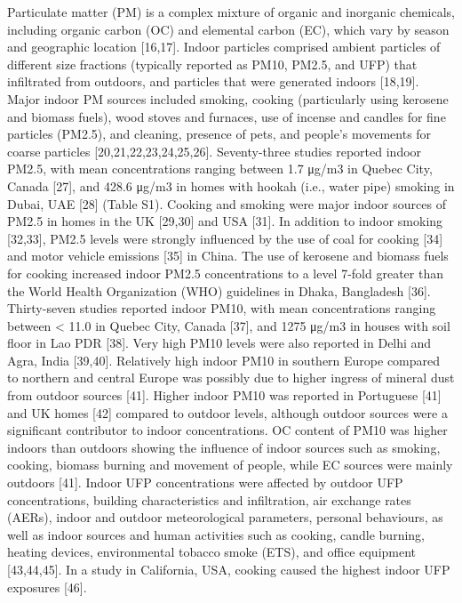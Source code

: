 Particulate matter (PM) is a complex mixture of organic and inorganic chemicals, including organic carbon (OC) and elemental carbon (EC), which vary by season and geographic location [16,17]. Indoor particles comprised ambient particles of different size fractions (typically reported as PM10, PM2.5, and UFP) that infiltrated from outdoors, and particles that were generated indoors [18,19]. Major indoor PM sources included smoking, cooking (particularly using kerosene and biomass fuels), wood stoves and furnaces, use of incense and candles for fine particles (PM2.5), and cleaning, presence of pets, and people’s movements for coarse particles [20,21,22,23,24,25,26].
Seventy-three studies reported indoor PM2.5, with mean concentrations ranging between 1.7 μg/m3 in Quebec City, Canada [27], and 428.6 μg/m3 in homes with hookah (i.e., water pipe) smoking in Dubai, UAE [28] (Table S1). Cooking and smoking were major indoor sources of PM2.5 in homes in the UK [29,30] and USA [31]. In addition to indoor smoking [32,33], PM2.5 levels were strongly influenced by the use of coal for cooking [34] and motor vehicle emissions [35] in China. The use of kerosene and biomass fuels for cooking increased indoor PM2.5 concentrations to a level 7-fold greater than the World Health Organization (WHO) guidelines in Dhaka, Bangladesh [36].
Thirty-seven studies reported indoor PM10, with mean concentrations ranging between < 11.0 in Quebec City, Canada [37], and 1275 μg/m3 in houses with soil floor in Lao PDR [38]. Very high PM10 levels were also reported in Delhi and Agra, India [39,40]. Relatively high indoor PM10 in southern Europe compared to northern and central Europe was possibly due to higher ingress of mineral dust from outdoor sources [41]. Higher indoor PM10 was reported in Portuguese [41] and UK homes [42] compared to outdoor levels, although outdoor sources were a significant contributor to indoor concentrations. OC content of PM10 was higher indoors than outdoors showing the influence of indoor sources such as smoking, cooking, biomass burning and movement of people, while EC sources were mainly outdoors [41].
Indoor UFP concentrations were affected by outdoor UFP concentrations, building characteristics and infiltration, air exchange rates (AERs), indoor and outdoor meteorological parameters, personal behaviours, as well as indoor sources and human activities such as cooking, candle burning, heating devices, environmental tobacco smoke (ETS), and office equipment [43,44,45]. In a study in California, USA, cooking caused the highest indoor UFP exposures [46].


